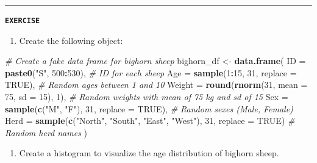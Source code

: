 \documentclass[
]{book}
\newenvironment{Shaded}{\begin{snugshade}}{\end{snugshade}}
\newcommand{\AttributeTok}[1]{\textcolor[rgb]{0.13,0.29,0.53}{#1}}
\newcommand{\CommentTok}[1]{\textcolor[rgb]{0.56,0.35,0.01}{\textit{#1}}}
\newcommand{\ConstantTok}[1]{\textcolor[rgb]{0.56,0.35,0.01}{#1}}
\newcommand{\DecValTok}[1]{\textcolor[rgb]{0.00,0.00,0.81}{#1}}
\newcommand{\FunctionTok}[1]{\textcolor[rgb]{0.13,0.29,0.53}{\textbf{#1}}}
\newcommand{\NormalTok}[1]{#1}
\newcommand{\OtherTok}[1]{\textcolor[rgb]{0.56,0.35,0.01}{#1}}
\newcommand{\SpecialCharTok}[1]{\textcolor[rgb]{0.81,0.36,0.00}{\textbf{#1}}}
\newcommand{\StringTok}[1]{\textcolor[rgb]{0.31,0.60,0.02}{#1}}
\providecommand{\tightlist}{%
  \setlength{\itemsep}{0pt}\setlength{\parskip}{0pt}}
\begin{document}
\begin{center}\rule{0.5\linewidth}{0.5pt}\end{center}

\textbf{\texttt{EXERCISE}}

\begin{enumerate}
\def\labelenumi{\arabic{enumi}.}
\tightlist
\item
  Create the following object:
\end{enumerate}

\begin{Shaded}
\begin{Highlighting}[]
\CommentTok{\# Create a fake data frame for bighorn sheep}
\NormalTok{bighorn\_df }\OtherTok{\textless{}{-}} \FunctionTok{data.frame}\NormalTok{(}
  \AttributeTok{ID =} \FunctionTok{paste0}\NormalTok{(}\StringTok{"S"}\NormalTok{, }\DecValTok{500}\SpecialCharTok{:}\DecValTok{530}\NormalTok{),      }\CommentTok{\# ID for each sheep}
  \AttributeTok{Age =} \FunctionTok{sample}\NormalTok{(}\DecValTok{1}\SpecialCharTok{:}\DecValTok{15}\NormalTok{, }\DecValTok{31}\NormalTok{, }\AttributeTok{replace =} \ConstantTok{TRUE}\NormalTok{),  }\CommentTok{\# Random ages between 1 and 10}
  \AttributeTok{Weight =} \FunctionTok{round}\NormalTok{(}\FunctionTok{rnorm}\NormalTok{(}\DecValTok{31}\NormalTok{, }\AttributeTok{mean =} \DecValTok{75}\NormalTok{, }\AttributeTok{sd =} \DecValTok{15}\NormalTok{), }\DecValTok{1}\NormalTok{),  }\CommentTok{\# Random weights with mean of 75 kg and sd of 15}
  \AttributeTok{Sex =} \FunctionTok{sample}\NormalTok{(}\FunctionTok{c}\NormalTok{(}\StringTok{"M"}\NormalTok{, }\StringTok{"F"}\NormalTok{), }\DecValTok{31}\NormalTok{, }\AttributeTok{replace =} \ConstantTok{TRUE}\NormalTok{),     }\CommentTok{\# Random sexes (Male, Female)}
  \AttributeTok{Herd =} \FunctionTok{sample}\NormalTok{(}\FunctionTok{c}\NormalTok{(}\StringTok{"North"}\NormalTok{, }\StringTok{"South"}\NormalTok{, }\StringTok{"East"}\NormalTok{, }\StringTok{"West"}\NormalTok{), }\DecValTok{31}\NormalTok{, }\AttributeTok{replace =} \ConstantTok{TRUE}\NormalTok{)  }\CommentTok{\# Random herd names}
\NormalTok{)}
\end{Highlighting}
\end{Shaded}

\begin{enumerate}
\def\labelenumi{\arabic{enumi}.}
\setcounter{enumi}{1}
\tightlist
\item
  Create a histogram to visualize the age distribution of bighorn sheep.
\end{enumerate}
\end{document}
